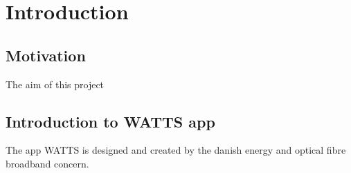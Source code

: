 \chapter{Introduction}

\section{Motivation}
The aim of this project

\section{Introduction to WATTS app}
The app WATTS is designed and created by the danish energy and optical fibre broadband concern. 